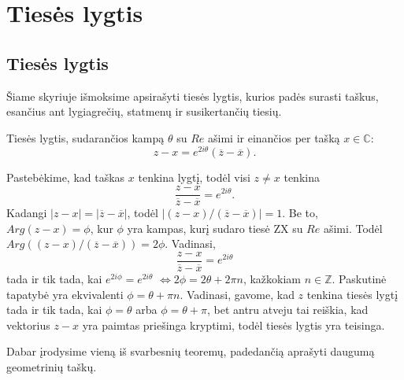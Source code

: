 \documentclass[11pt,a4paper,twoside]{book}
\begin{document}
\section{Tiesės lygtis}
\subsection*{Tiesės lygtis}

Šiame skyriuje išmoksime apsirašyti tiesės lygtis, kurios padės surasti taškus, esančius ant lygiagrečių, statmenų ir susikertančių tiesių.

\begin{thmnr}
Tiesės lygtis, sudarančios kampą $\theta$ su $Re$ ašimi ir einančios per tašką $x \in \mathbb{C}$: $$z-x=e^{2i\theta}(\overline{z}-\overline{x}).$$
\end{thmnr}
\begin{sprendimas}
Pastebėkime, kad taškas $x$ tenkina lygtį, todėl visi $ z \neq x$ tenkina $$\frac{z-x}{\overline{z}-\overline{x}}=e^{2i\theta}.$$ Kadangi $|z-x|=|\overline{z}-\overline{x}|$, todėl $|(z-x)/(\overline{z}-\overline{x})|=1$. Be to, $Arg (z-x) =\phi$, kur $\phi$ yra kampas, kurį sudaro tiesė ZX su $Re$ ašimi. Todėl $Arg ((z-x)/(\overline{z}-\overline{x})) =2\phi$. Vadinasi, 
$$\frac{z-x}{\overline{z}-\overline{x}}=e^{2i\theta}$$ tada ir tik tada, kai $e^{2i\phi}=e^{2i\theta}$ $\Leftrightarrow 2\phi =2\theta + 2\pi n$, kažkokiam $n \in \mathbb{Z}.$ Paskutinė tapatybė yra ekvivalenti $\phi = \theta + \pi n$. Vadinasi, gavome, kad $z$ tenkina tiesės lygtį tada ir tik tada, kai $\phi = \theta$ arba $\phi = \theta + \pi$, bet antru atveju tai reiškia, kad vektorius $z-x$ yra paimtas priešinga kryptimi, todėl tiesės lygtis yra teisinga.
\end{sprendimas}




\bigskip
Dabar įrodysime vieną iš svarbesnių teoremų, padedančią aprašyti daugumą geometrinių taškų.
\end{document}
